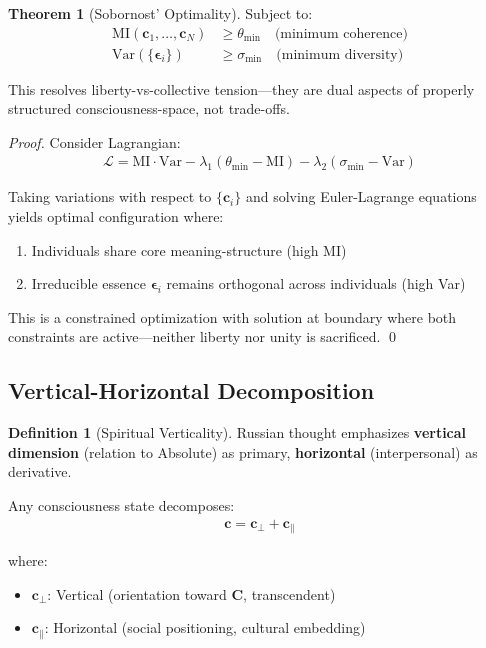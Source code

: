 \documentclass[11pt,a4paper]{article}
\theoremstyle{definition}
\newtheorem{definition}{Definition}[section]
\newtheorem{theorem}{Theorem}[section]
\theoremstyle{remark}
\newcommand{\cc}{\mathbf{c}}
\begin{document}
\begin{enumerate}
\begin{theorem}[Sobornost' Optimality]
Subject to:
\begin{align}
\text{MI}(\cc_1, \ldots, \cc_N) &\geq \theta_{\min} \quad \text{(minimum coherence)} \\
\text{Var}(\{\boldsymbol{\epsilon}_i\}) &\geq \sigma_{\min} \quad \text{(minimum diversity)}
\end{align}

This resolves liberty-vs-collective tension—they are dual aspects of properly structured consciousness-space, not trade-offs.
\end{theorem}

\begin{proof}
Consider Lagrangian:
\begin{align}
\mathcal{L} = \text{MI} \cdot \text{Var} - \lambda_1(\theta_{\min} - \text{MI}) - \lambda_2(\sigma_{\min} - \text{Var})
\end{align}

Taking variations with respect to \(\{\cc_i\}\) and solving Euler-Lagrange equations yields optimal configuration where:
\begin{enumerate}
    \item Individuals share core meaning-structure (high MI)
    \item Irreducible essence \(\boldsymbol{\epsilon}_i\) remains orthogonal across individuals (high Var)
\end{enumerate}

This is a constrained optimization with solution at boundary where both constraints are active—neither liberty nor unity is sacrificed. \qed
\end{proof}

\subsection{Vertical-Horizontal Decomposition}

\begin{definition}[Spiritual Verticality]
Russian thought emphasizes \textbf{vertical dimension} (relation to Absolute) as primary, \textbf{horizontal} (interpersonal) as derivative.

Any consciousness state decomposes:
\begin{align}
\cc = \cc_{\perp} + \cc_{\parallel}
\end{align}

where:
\begin{itemize}
\item \(\cc_{\perp}\): Vertical (orientation toward \(\mathbf{C}\), transcendent)
\item \(\cc_{\parallel}\): Horizontal (social positioning, cultural embedding)
\end{itemize}


\end{definition}
\end{enumerate}
\end{document}
